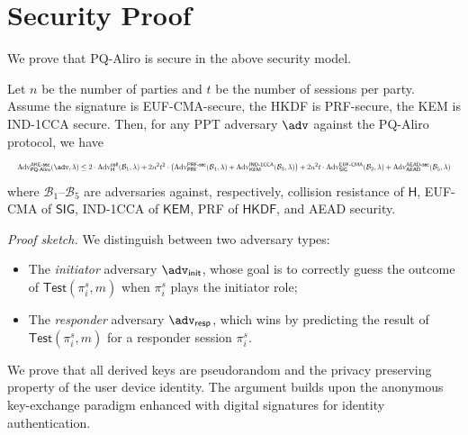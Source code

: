 \documentclass[runningheads]{llncs}
\newcommand{\kem}{\mathsf{KEM}}
\newcommand{\hkdf}{\mathsf{HKDF}}
\begin{document}
\section{Security Proof}
\label{sec:proof}
We prove that PQ-Aliro is secure in the above security model.

\begin{theorem}
    Let $n$ be the number of parties and $t$ be the number of sessions per party.
    Assume the signature is EUF-CMA-secure, the HKDF is PRF-secure, the KEM is IND-1CCA secure.
    Then, for any PPT adversary $\adv$ against the PQ-Aliro protocol, we have
\begin{equation*}
\resizebox{\linewidth}{!}{$\displaystyle
\operatorname{Adv}_{\mathsf{PQ}\text{-}\mathsf{Aliro}}^{\mathsf{AKE}\text{-}\mathsf{sec}}(\adv, \lambda)
\leq 2\cdot \operatorname{Adv}_{\mathsf{H}}^{\mathsf{coll}}(\mathcal{B}_{1}, \lambda)
+ 2n^{2} t^{2} \cdot \bigl( \operatorname{Adv}_{\mathsf{PRF}}^{\mathsf{PRF}\text{-}\mathsf{sec}}(\mathcal{B}_{4}, \lambda)
+ \operatorname{Adv}_{\kem}^{\mathsf{IND}\text{-}\mathsf{1CCA}}(\mathcal{B}_{3},\lambda)\bigr)
+ 2n^{2} t \cdot \operatorname{Adv}_{\mathsf{SIG}}^{\mathsf{EUF}\text{-}\mathsf{CMA}}(\mathcal{B}_{2}, \lambda)
+ \mathrm{Adv}_{\mathsf{AEAD}}^{\mathsf{AEAD}\text{-}\mathsf{sec}}(\mathcal{B}_{5},\lambda)
$}
\end{equation*}
where $\mathcal{B}_{1}$--$\mathcal{B}_{5}$ are adversaries against, respectively, collision resistance of $\mathsf{H}$, EUF-CMA of $\mathsf{SIG}$, IND-1CCA of $\kem$, PRF of $\hkdf$, and AEAD security.
\end{theorem}

\noindent\textit{Proof sketch.}
We distinguish between two adversary types:
{\sloppy
    \begin{itemize}
        \item The \emph{initiator} adversary $\adv_{\sf init}$, whose goal is to correctly guess the outcome of $\mathsf{Test}(\pi_{i}^{s}, m)$ when $\pi_{i}^{s}$ plays the initiator role;
        \item The \emph{responder} adversary $\adv_{\sf resp}$, which wins by predicting the result of $\mathsf{Test}(\pi_{i}^{s}, m)$ for a responder session $\pi_{i}^{s}$.
    \end{itemize}
\par}
We prove that all derived keys are pseudorandom and the privacy preserving property of the user device identity.
The argument builds upon the anonymous key-exchange paradigm enhanced with digital signatures for identity authentication.
\end{document}
